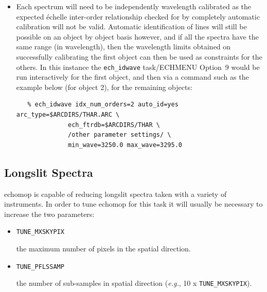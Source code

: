 \documentclass[11pt,twoside]{article}
\makeatletter
\newcommand{\htmlref}[2]{#1}
\newcommand{\xlabel}[1]{}
\newcommand{\mlabel}[1]{\xlabel{#1}\label{#1}}
\newcommand{\sunspec}[2]{#1}
\renewcommand{\sunspec}[2]{#2}
\newcommand{\myindex}[1]{\index{#1}}
\newcommand{\indexcmdname}[1]{\index{#1@\protect\cmdname{#1}}}
\renewcommand{\myindex}[1]{}
\renewcommand{\indexcmdname}[1]{}
\newcommand{\cmdname}{\begingroup \catcode`\_=12 \realcmdname}
\newcommand{\realcmdname}[1]{\endgroup\texttt{#1}}
\makeatother
\begin{document}
\myindex{Wavelength calibration!fibre data}
\begin{itemize}

\item Each spectrum will need to be independently wavelength
      calibrated as the expected \'{e}chelle inter-order relationship checked
      for by completely automatic calibration will not be valid. Automatic
      identification of lines will still be possible on an object by object
      basis however, and if all the spectra have the same range (in
      wavelength), then the wavelength limits obtained on successfully
      calibrating the first object can then be used as constraints for the
      others. In this instance the \htmlref{{\tt ech\_idwave} task/ECHMENU
      Option~9}{ech_idwave}
      would be run interactively for the first object, and then via a command
      such as the example below (for object 2), for the remaining objects:

\indexcmdname{ECH_IDWAVE}
\begin{verbatim}
   % ech_idwave idx_num_orders=2 auto_id=yes arc_type=$ARCDIRS/THAR.ARC \
              ech_ftrdb=$ARCDIRS/THAR \
              /other parameter settings/ \
              min_wave=3250.0 max_wave=3295.0
\end{verbatim}

\end{itemize}


\subsection{\mlabel{longslit_spectra}Longslit Spectra}
\myindex{Longslit spectra}

{\sc echomop} is capable of reducing longslit spectra taken with a variety of
instruments.  In order to tune {\sc echomop} for this task it will usually be
necessary to increase the two parameters:

\begin{itemize}

\item {\texttt{TUNE\_MXSKYPIX}}

      the maximum number of pixels in the spatial direction.

\item {\texttt{TUNE\_PFLSSAMP}}

      the number of sub-samples in spatial direction ({\it{e.g.}},
      10 \sunspec{$\times$}{x} \texttt{TUNE\_MXSKYPIX}).

\end{itemize}
\end{document}
